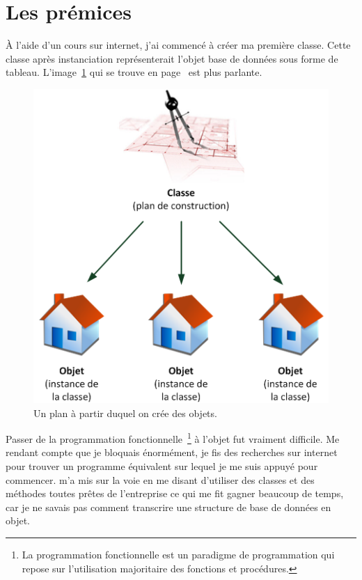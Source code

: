 \section{Les prémices} %
\label{sec:Les prémices}

À l'aide d'un cours sur internet, j'ai commencé à créer ma première
classe.  Cette classe après instanciation représenterait l'objet \og
base de données \fg{} sous forme de tableau. L'image~\ref{obj} qui se
trouve en page~\pageref{obj} est plus parlante.

\begin{figure}
    \begin{center}
        \includegraphics[scale=0.7]{images/objet.png}
        \caption{Un plan à partir duquel on crée des objets.}
        \label{obj}
    \end{center}
\end{figure}

Passer de la programmation fonctionnelle\, \footnote{La programmation
fonctionnelle est un paradigme de programmation qui repose sur
l'utilisation majoritaire des fonctions et procédures.} à l'objet fut
vraiment difficile. Me rendant compte que je bloquais énormément, je fis
des recherches sur internet pour trouver un programme équivalent sur
lequel je me suis appuyé pour commencer.  m'a mis sur la
voie en me disant d'utiliser des classes et des méthodes toutes prêtes
de l'entreprise ce qui me fit gagner beaucoup de temps, car je ne savais
pas comment transcrire une structure de base de données en objet.

